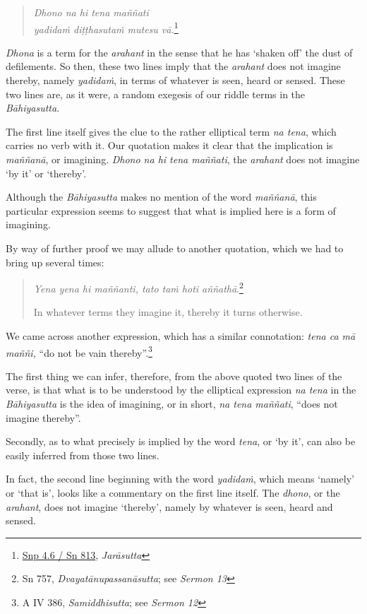\begin{quote}
\emph{Dhono na hi tena maññati}\\
\emph{yadidaṁ diṭṭhasutaṁ mutesu vā.}\footnote{\href{https://suttacentral.net/snp4.6/pli/ms}{Snp 4.6 / Sn 813}, \emph{Jarāsutta}}
\end{quote}

\emph{Dhona} is a term for the \emph{arahant} in the sense that he has `shaken off' the dust of defilements. So then, these two lines imply that the \emph{arahant} does not imagine thereby, namely \emph{yadidaṁ}, in terms of whatever is seen, heard or sensed. These two lines are, as it were, a random exegesis of our riddle terms in the \emph{Bāhiyasutta}.

The first line itself gives the clue to the rather elliptical term \emph{na tena}, which carries no verb with it. Our quotation makes it clear that the implication is \emph{maññanā}, or imagining. \emph{Dhono na hi tena maññati}, the \emph{arahant} does not imagine `by it' or `thereby'.

Although the \emph{Bāhiyasutta} makes no mention of the word \emph{maññanā}, this particular expression seems to suggest that what is implied here is a form of imagining.

By way of further proof we may allude to another quotation, which we had to bring up several times:

\begin{quote}
\emph{Yena yena hi maññanti, tato taṁ hoti aññathā}.\footnote{Sn 757, \emph{Dvayatānupassanāsutta}; see \emph{Sermon 13}}

In whatever terms they imagine it, thereby it turns otherwise.
\end{quote}

We came across another expression, which has a similar connotation: \emph{tena ca mā maññi,} ``do not be vain thereby''.\footnote{A IV 386, \emph{Samiddhisutta}; see \emph{Sermon 12}}

The first thing we can infer, therefore, from the above quoted two lines of the verse, is that what is to be understood by the elliptical expression \emph{na tena} in the \emph{Bāhiyasutta} is the idea of imagining, or in short, \emph{na tena maññati}, ``does not imagine thereby''.

Secondly, as to what precisely is implied by the word \emph{tena}, or `by it', can also be easily inferred from those two lines.

In fact, the second line beginning with the word \emph{yadidaṁ}, which means `namely' or `that is', looks like a commentary on the first line itself. The \emph{dhono}, or the \emph{arahant}, does not imagine `thereby', namely by whatever is seen, heard and sensed.

